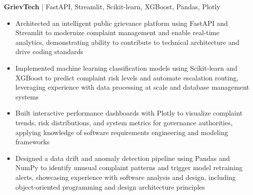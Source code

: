 \textbf{GrievTech} | FastAPI, Streamlit, Scikit-learn, XGBoost, Pandas, Plotly \\
\begin{itemize}
  \item Architected an intelligent public grievance platform using FastAPI and Streamlit to modernize complaint management and enable real-time analytics, demonstrating ability to contribute to technical architecture and drive coding standards
  \item Implemented machine learning classification models using Scikit-learn and XGBoost to predict complaint risk levels and automate escalation routing, leveraging experience with data processing at scale and database management systems
  \item Built interactive performance dashboards with Plotly to visualize complaint trends, risk distributions, and system metrics for governance authorities, applying knowledge of software requirements engineering and modeling frameworks
  \item Designed a data drift and anomaly detection pipeline using Pandas and NumPy to identify unusual complaint patterns and trigger model retraining alerts, showcasing experience with software analysis and design, including object-oriented programming and design architecture principles
\end{itemize}